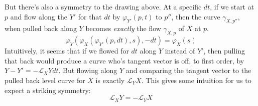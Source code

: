 \documentclass[../master.tex]{subfiles}
\begin{document}
	But there's also a symmetry to the drawing above. At a specific $dt$, if we start at $p$ and flow along the $Y'$ for that $dt$ by $\varphi_{Y'}(p, t)$ to $p''$, then the curve $\gamma_{X, p''}$, when pulled back along $Y$ becomes \emph{exactly} the flow $\gamma_{X,p}$ of $X$ at $p$.
	\begin{equation}
		\varphi_Y (\varphi_X (\varphi_{Y'} (p, dt), s), -dt) =  \varphi_X(s)
	\end{equation}
	Intuitively, it seems that if we flowed for $dt$ along $Y$ instead of $Y'$, then pulling that back would produce a curve who's tangent vector is off, to first order, by $Y-Y' = - \mathcal L_X Y dt$. But flowing along $Y$ and comparing the tangent vector to the pulled back level curve for $X$ is exactly $\mathcal L_Y X$. This gives some intuition for us to expect a striking symmetry:
	\begin{equation}
		\mathcal L_X Y = - \mathcal L_Y X
	\end{equation}
\end{document}
